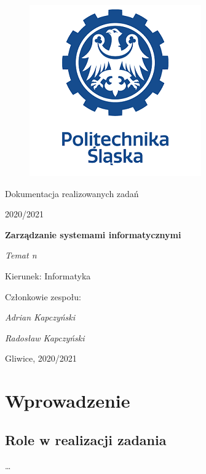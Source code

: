 \documentclass[12pt,a4paper]{article}
\begin{document}
\clearpage
\begin{figure}[h]
\centering
\includegraphics{media/ps-logo.png}
\end{figure}
\hspace{3cm}
\begin{center}Dokumentacja realizowanych zadań\end{center}
\begin{center}2020/2021\end{center}
\hspace{3cm}
\begin{center}\large\textbf{Zarządzanie systemami informatycznymi}\end{center}
\begin{center}\large\textit{Temat n}\end{center}

\hspace{7cm}
\begin{flushright}Kierunek: Informatyka
\end{flushright}
\begin{flushright}Członkowie zespołu:
\par
\textit{Adrian Kapczyński}
\par
\textit{Radosław Kapczyński}
\end{flushright}
\vfill
\begin{center}Gliwice, 2020/2021\end{center}

\newpage
{}
\tableofcontents

\newpage
\section{Wprowadzenie}

\subsection{Role w realizacji zadania}
\ldots 
\end{document}
